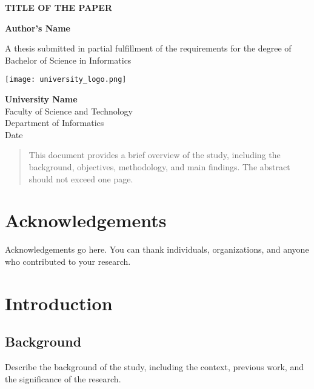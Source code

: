 \documentclass[a4paper,12pt]{article}
\begin{document}
\begin{titlepage}
    \centering
    \vspace*{1cm}

    \textbf{TITLE OF THE PAPER}

    \vspace{1.5cm}

    \textbf{Author's Name}

    \vfill

    A thesis submitted in partial fulfillment of the requirements for the degree of\\
    Bachelor of Science in Informatics

    \vspace{0.8cm}

    \texttt{[image: university\_logo.png]}

    \textbf{University Name}\\
    Faculty of Science and Technology\\
    Department of Informatics\\
    Date

\end{titlepage}

\begin{abstract}
\noindent
This document provides a brief overview of the study, including the background, objectives, methodology, and main findings. The abstract should not exceed one page.
\end{abstract}

\section*{Acknowledgements}
\noindent
Acknowledgements go here. You can thank individuals, organizations, and anyone who contributed to your research.

\tableofcontents
\newpage

\listoftables
\listoffigures
\newpage

\section{Introduction}
\subsection{Background}
\noindent
Describe the background of the study, including the context, previous work, and the significance of the research.
\end{document}
